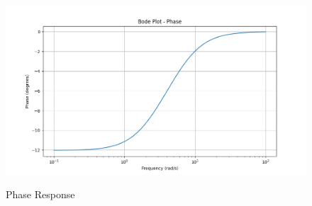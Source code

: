 \documentclass[journal,12pt,twocolumn]{IEEEtran}
\theoremstyle{remark}
\begin{document}
\begin{figure}[h!]
  \centering
  \caption{Phase Response}
  \includegraphics[width=\columnwidth]{2023/EE/38/figs/phase.png}
  \label{fig:ashbodepahse}
\end{figure}
\end{document}

